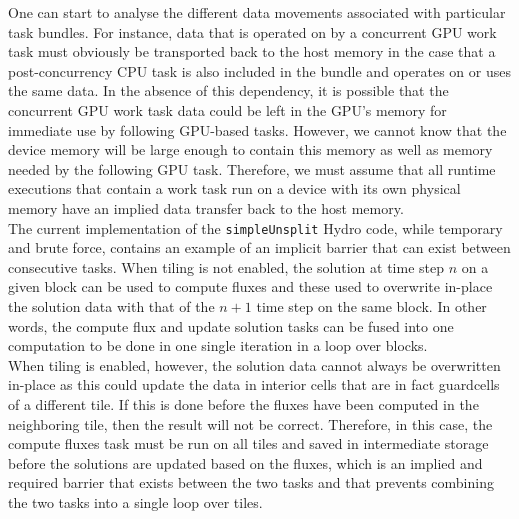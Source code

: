 \documentclass{article}
\begin{document}
One can start to analyse the different data movements associated with particular
task bundles.  For instance, data that is operated on by a concurrent GPU work
task must obviously be transported back to the host memory in the case that a
post-concurrency CPU task is also included in the bundle and operates on or uses
the same data.  In the absence of this dependency, it is possible that the
concurrent GPU work task data could be left in the GPU's memory for immediate
use by following GPU-based tasks.  However, we cannot know that the device
memory will be large enough to contain this memory as well as memory needed by
the following GPU task.  Therefore, we must assume that all runtime executions
that contain a work task run on a device with its own physical memory have an
implied data transfer back to the host memory.\\

The current implementation of the \texttt{simpleUnsplit} Hydro code, while temporary and
brute force, contains an example of an implicit barrier that can exist between
consecutive tasks.  When tiling is not enabled, the solution at time step $n$ on
a given block can be used to compute fluxes and these used to overwrite in-place
the solution data with that of the $n+1$ time step on the same block.  In other
words, the compute flux and update solution tasks can be fused into one
computation to be done in one single iteration in a loop over blocks.\\

When tiling is enabled, however, the solution data cannot always be overwritten
in-place as this could update the data in interior cells that are in fact
guardcells of a different tile.  If this is done before the fluxes have been
computed in the neighboring tile, then the result will not be correct.
Therefore, in this case, the compute fluxes task must be run on all tiles and
saved in intermediate storage before the solutions are updated based on the
fluxes, which is an implied and required barrier that exists between
the two tasks and that prevents combining the two tasks into a single loop over
tiles.\\

\end{document}
